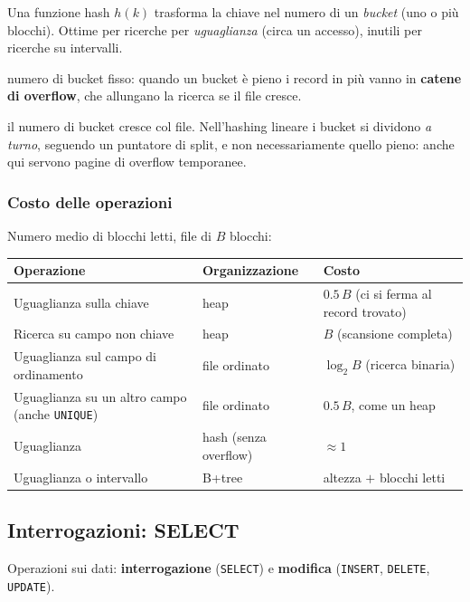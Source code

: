 \documentclass[a4paper,12pt]{article}
\begin{document}
Una funzione hash $h(k)$ trasforma la chiave nel numero di un \emph{bucket}
(uno o più blocchi). Ottime per ricerche per \emph{uguaglianza} (circa un
accesso), inutili per ricerche su intervalli.
\begin{description}[style=nextline]
  \item[Hashing statico] numero di bucket fisso: quando un bucket è pieno i
    record in più vanno in \textbf{catene di overflow}, che allungano la
    ricerca se il file cresce.
  \item[Hashing dinamico / lineare] il numero di bucket cresce col file.
    Nell'hashing lineare i bucket si dividono \emph{a turno}, seguendo un
    puntatore di split, e non necessariamente quello pieno: anche qui servono
    pagine di overflow temporanee.
\end{description}

\subsubsection{Costo delle operazioni}

Numero medio di blocchi letti, file di $B$ blocchi:
\begin{center}
\begin{tabular}{p{5.6cm}p{3.6cm}p{5.6cm}}
  \textbf{Operazione} & \textbf{Organizzazione} & \textbf{Costo} \\ \hline
  Uguaglianza sulla chiave & heap & $0.5\,B$ (ci si ferma al record trovato) \\
  Ricerca su campo non chiave & heap & $B$ (scansione completa) \\
  Uguaglianza sul campo di ordinamento & file ordinato & $\log_2 B$ (ricerca binaria) \\
  Uguaglianza su un altro campo (anche \texttt{UNIQUE}) & file ordinato & $0.5\,B$, come un heap \\
  Uguaglianza & hash (senza overflow) & $\approx 1$ \\
  Uguaglianza o intervallo & B+tree & altezza $+$ blocchi letti \\
\end{tabular}
\end{center}

\subsection{Interrogazioni: SELECT}

Operazioni sui dati: \textbf{interrogazione} (\texttt{SELECT}) e
\textbf{modifica} (\texttt{INSERT}, \texttt{DELETE}, \texttt{UPDATE}).
\end{document}
